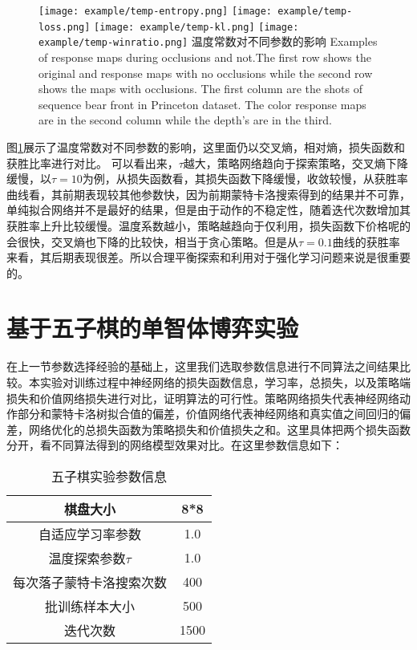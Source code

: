 \begin{figure}[t]
	\centering
	{\texttt{[image: example/temp-entropy.png]}}
	\hspace{0.5em}
	{\texttt{[image: example/temp-loss.png]}}
	\newline
	\centering
	{\texttt{[image: example/temp-kl.png]}}
	\hspace{0.5em}
	{\texttt{[image: example/temp-winratio.png]}}
	\bicaption
	{温度常数对不同参数的影响}
	{Examples of response maps during occlusions and not.The first row shows the original and response maps with no occlusions while the second row shows the maps with occlusions. The first column are the shots of sequence bear front in Princeton dataset. The color response maps are in the second column while the depth’s are in the third.}
	\label{fig2:response}
\end{figure}
图\ref{fig2:response}展示了温度常数对不同参数的影响，这里面仍以交叉熵，相对熵，损失函数和获胜比率进行对比。
可以看出来，$\tau$越大，策略网络趋向于探索策略，交叉熵下降缓慢，以$\tau=10$为例，从损失函数看，其损失函数下降缓慢，收敛较慢，从获胜率曲线看，其前期表现较其他参数快，因为前期蒙特卡洛搜索得到的结果并不可靠，单纯拟合网络并不是最好的结果，但是由于动作的不稳定性，随着迭代次数增加其获胜率上升比较缓慢。温度系数越小，策略越趋向于仅利用，损失函数下价格呢的会很快，交叉熵也下降的比较快，相当于贪心策略。但是从$\tau=0.1$曲线的获胜率来看，其后期表现很差。所以合理平衡探索和利用对于强化学习问题来说是很重要的。
\section{基于五子棋的单智体博弈实验}

在上一节参数选择经验的基础上，这里我们选取参数信息进行不同算法之间结果比较。本实验对训练过程中神经网络的损失函数信息，学习率，总损失，以及策略端损失和价值网络损失进行对比，证明算法的可行性。策略网络损失代表神经网络动作部分和蒙特卡洛树拟合值的偏差，价值网络代表神经网络和真实值之间回归的偏差，网络优化的总损失函数为策略损失和价值损失之和。这里具体把两个损失函数分开，看不同算法得到的网络模型效果对比。在这里参数信息如下：
\begin{table}
	\centering
	\caption{五子棋实验参数信息}
	\begin{tabular}{c|c}
		\hline 
		棋盘大小 & 8*8 \\ 
		\hline 
		自适应学习率参数 & 1.0 \\ 
		\hline 
		温度探索参数$\tau$& 1.0 \\ 
		\hline 
		每次落子蒙特卡洛搜索次数 & 400 \\ 
		\hline 
		批训练样本大小 & 500 \\ 
		\hline 
		迭代次数 & 1500 \\ 
		\hline 
	\end{tabular} 
\end{table}


